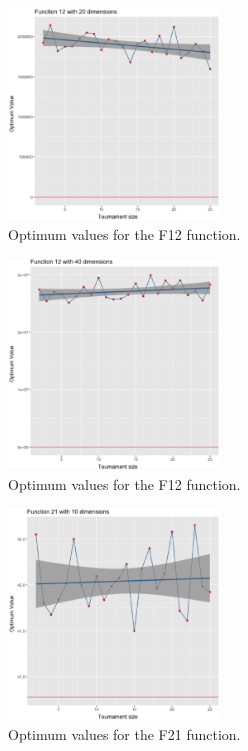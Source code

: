 \begin{figure}[!ht]
	\includegraphics[width=0.5\textwidth]{img/12dim_20.ps}
	\caption{Optimum values for the F12 function.}
	\label{12dim_20}
\end{figure}

\begin{figure}[!ht]
	\includegraphics[width=0.5\textwidth]{img/12dim_40.ps}
	\caption{Optimum values for the F12 function.}
	\label{12dim_40}
\end{figure}



\begin{figure}[!ht]
	\includegraphics[width=0.5\textwidth]{img/21dim_10.ps}
	\caption{Optimum values for the F21 function.}
	\label{21dim_10}
\end{figure}

